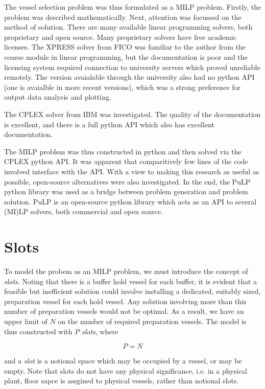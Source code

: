 The vessel selection problem was thus formulated as a MILP problem.
Firstly, the problem was described mathematically.
Next, attention was focussed on the method of solution.  
There are many available linear programming solvers, both proprietary and open
source.
Many proprietary solvers have free academic licenses.
The XPRESS solver from FICO was familiar to the author from the course module
in linear programming, but the documentation is poor and the licensing system
required connection to university servers which proved unreliable remotely.
The version avaialable through the university also had no python API (one is
avaialble in more recent versions), which was a strong preference for output
data analysis and plotting.

The CPLEX solver from IBM was investigated.  
The quality of the documentation is excellent, and there is a full python API
which also has excellent documentation.

The MILP problem was thus constructed in python and then solved via the CPLEX
python API.
It was apparent that comparitively few lines of the code involved interface
with the API.
With a view to making this research as useful as possible, open-source
alternatives were also investigated.
In the end, the PuLP python library was used as a bridge between problem
generation and problem solution.
PuLP is an open-source python library which acts as an API to several
(MI)LP solvers, both commercial and open source.

\section{Slots}\label{S.slots}

To model the probem as an MILP problem, we must introduce the concept of
\emph{slots}.
Noting that there is a buffer hold vessel for each buffer, it is evident that 
a feasible but inefficient solution could involve installing a dedicated,
suitably sized, preparation vessel for each hold vessel.  
Any solution involving more than this number of preparation vessels would not
be optimal.
As a result, we have an upper limit of $N$ on the number of required
preparation vessels.
The model is thus constructed with $P$ \emph{slots}, where

\begin{equation}
    P = N
\end{equation}

and a \emph{slot} is a notional space which may be occupied by a vessel, or may
be empty.
Note that slots do not have any physical significance, i.e. in a physical
plant, floor sapce is assgined to physical vessels, rather than notional slots.

